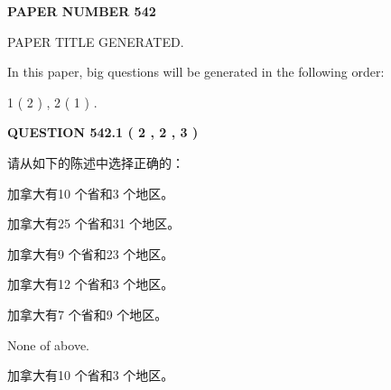 \documentclass{ctexart}
\begin{document}
   
   
   
\newpage 
\setcounter{page}{ 
   542001 } 
   
   
   
   
 {\textbf{ \Large{ PAPER NUMBER  542  }}}
   
   
\vspace{0.2in}
   
   
   
   
   
   
   
   
 \vspace{0.2in}
 
 
 
 
   
   
 PAPER TITLE GENERATED.
   
   
   
\vspace{0.2in}
   
In this paper, big questions will be generated in the following order: 
   
   
   1 ( 2 )
 ,
   2 ( 1 )
 .
  
\vspace{0.2in}
  
{\textbf{\Large{QUESTION
542.1 
 ( 2 , 2 , 3 )
}}}
  
  
请从如下的陈述中选择正确的：
 
 
加拿大有10 个省和3 个地区。
 
 
加拿大有25 个省和31 个地区。
 
 
加拿大有9 个省和23 个地区。
 
 
加拿大有12 个省和3 个地区。
 
 
加拿大有7 个省和9 个地区。
 
 
 None of above.
 
 
\noindent{}
 
 
加拿大有10 个省和3 个地区。
 
 
\noindent{}
 
 
   
   
   
\end{document}
